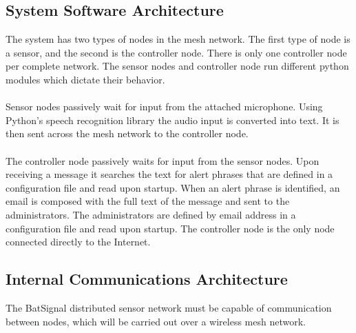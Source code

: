 \documentclass[11pt,a4paper]{article}
\begin{document}
\subsection{System Software Architecture}
The system has two types of nodes in the mesh network. The first type of node is a sensor, and the second is the controller node.  There is only one controller node per complete network. The sensor nodes and controller node run different python modules which dictate their behavior. \\\\
Sensor nodes passively wait for input from the attached microphone.  Using Python's speech recognition library the audio input is converted into text.  It is then sent across the mesh network to the controller node. \\\\
The controller node passively waits for input from the sensor nodes. Upon receiving a message it searches the text for alert phrases that are defined in a configuration file and read upon startup. When an alert phrase is identified, an email is composed with the full text of the message and sent to the administrators. The administrators are defined by email address in a configuration file and read upon startup. The controller node is the only node connected directly to the Internet.


\subsection{Internal Communications Architecture}
The BatSignal distributed sensor network must be capable of communication between nodes, which will be carried out over a wireless mesh network. 
\end{document}
